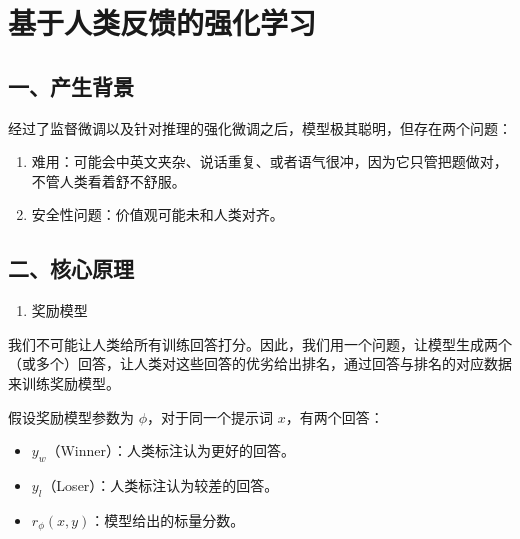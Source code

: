 \setcounter{section}{0}

\hypertarget{ux57faux4e8eux4ebaux7c7bux53cdux9988ux7684ux5f3aux5316ux5b66ux4e60}{%
\section{基于人类反馈的强化学习}\label{ux57faux4e8eux4ebaux7c7bux53cdux9988ux7684ux5f3aux5316ux5b66ux4e60}}

\hypertarget{ux4e00ux4ea7ux751fux80ccux666f}{%
\subsection{一、产生背景}\label{ux4e00ux4ea7ux751fux80ccux666f}}

经过了监督微调以及针对推理的强化微调之后，模型极其聪明，但存在两个问题：

\begin{enumerate}
\def\labelenumi{\arabic{enumi}.}
\item
  难用：可能会中英文夹杂、说话重复、或者语气很冲，因为它只管把题做对，不管人类看着舒不舒服。
\item
  安全性问题：价值观可能未和人类对齐。
\end{enumerate}

\hypertarget{ux4e8cux6838ux5fc3ux539fux7406}{%
\subsection{二、核心原理}\label{ux4e8cux6838ux5fc3ux539fux7406}}

\begin{enumerate}
\def\labelenumi{\arabic{enumi}.}
\tightlist
\item
  奖励模型
\end{enumerate}

我们不可能让人类给所有训练回答打分。因此，我们用一个问题，让模型生成两个（或多个）回答，让人类对这些回答的优劣给出排名，通过回答与排名的对应数据来训练奖励模型。

假设奖励模型参数为 \(\phi\)，对于同一个提示词 \(x\)，有两个回答：

\begin{itemize}
\tightlist
\item
  \(y_w\)（Winner）：人类标注认为更好的回答。
\item
  \(y_l\)（Loser）：人类标注认为较差的回答。
\item
  \(r_\phi(x,y)\)：模型给出的标量分数。
\end{itemize}


